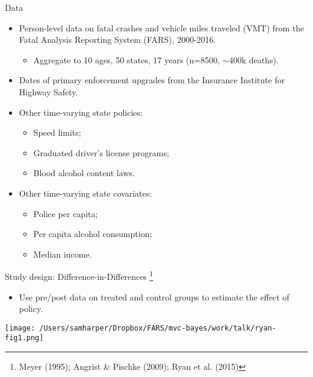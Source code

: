 \documentclass[english]{beamer}\usepackage[]{graphicx}\usepackage[]{color}
\begin{document}
%
\begin{frame}{Data}
\begin{itemize}
\item Person-level data on fatal crashes and vehicle miles traveled (VMT)
from the Fatal Analysis Reporting System (FARS), 2000-2016.
\begin{itemize}
\item Aggregate to 10 ages, 50 states, 17 years (n=8500, $\sim$400k deaths).
\end{itemize}
\item Dates of primary enforcement upgrades from the Insurance Institute
for Highway Safety.\medskip{}
\item Other time-varying state policies:
\begin{itemize}
\item Speed limits;
\item Graduated driver's license programs;
\item Blood alcohol content laws.\medskip{}
\end{itemize}
\item Other time-varying state covariates:
\begin{itemize}
\item Police per capita;
\item Per capita alcohol consumption;
\item Median income.
\end{itemize}
\end{itemize}
\end{frame}
%
\begin{frame}[plain]{Study design: Difference-in-Differences}
\footnote{Meyer (1995); Angrist \& Pischke (2009); Ryan et al. (2015)}
\begin{itemize}
\item Use pre/post data on treated and control groups to estimate the effect
of policy.
\end{itemize}
\begin{center}
\texttt{[image: /Users/samharper/Dropbox/FARS/mvc-bayes/work/talk/ryan-fig1.png]}
\par\end{center}

\end{frame}
%
\end{document}
